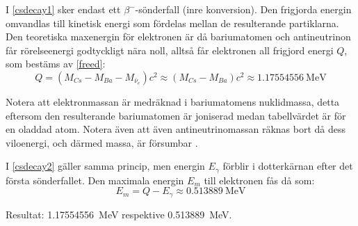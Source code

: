 I \eqref{csdecay1} sker endast ett $\beta^-$-sönderfall (inre konversion). Den
frigjorda energin omvandlas till kinetisk energi som fördelas mellan de
resulterande partiklarna. Den teoretiska maxenergin för elektronen är då
bariumatomen och antineutrinon får rörelseenergi godtyckligt nära noll, alltså
får elektronen all frigjord energi $Q$, som bestäms av \eqref{freed}:
%
\begin{equation}
    Q = (M_{Cs} - M_{Ba} - M_{\bar{\nu}_e})c^2 \approx (M_{Cs} - M_{Ba})c^2 \approx \qty{1.17554556}{\MeV}
\end{equation}

Notera att elektronmassan är medräknad i bariumatomens nuklidmassa, detta
eftersom den resulterande bariumatomen är joniserad medan tabellvärdet är
för en oladdad atom. Notera även att även antineutrinomassan räknas bort då
dess viloenergi, och därmed massa, är försumbar .

I \eqref{csdecay2} gäller samma princip, men energin $E_\gamma$ förblir i
dotterkärnan efter det första sönderfallet. Den maximala energin $E_m$ till
elektronen fås då som:
%
\begin{equation}
    E_m = Q - E_\gamma \approx \qty{0.513889}{\MeV}
\end{equation}

Resultat: \qty{1.17554556}{\MeV} respektive \qty{0.513889}{\MeV}.

